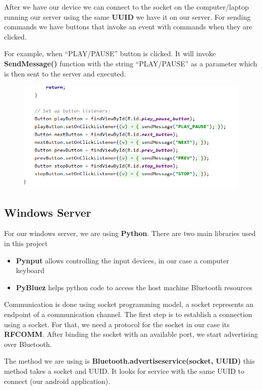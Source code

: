 \documentclass{article}
\begin{document}
After we have our device we can connect to the socket on the computer/laptop running our server
using the same \textbf{UUID} we have it on our server.  For sending commands we have buttons that
invoke an event with commands when they are clicked.

For example, when “PLAY/PAUSE” button is clicked. It will invoke \textbf{SendMessage()} function
with the string “PLAY/PAUSE” as a parameter which is then sent to the server and executed. 

\begin{figure}[ht]
\centering
\includegraphics[scale=.5]{./sendMsg.png}
\end{figure}

\subsection{Windows Server}

For our windows server, we are using \textbf{Python}. There are two main libraries used in this project

\begin{itemize}
\item \textbf{Pynput} allows controlling the input devices, in our case a computer keyboard

\item \textbf{PyBluez} helps python code to access the host machine Bluetooth resources

\end{itemize}


Communication is done using socket programming model, a socket represents an endpoint of a
communication channel. The first step is to establish a connection using a socket. For that, we need
a protocol for the socket in our case its \textbf{RFCOMM}. After binding the socket with an
available port, we start advertising over Bluetooth.
 
The method we are using is \textbf{ Bluetooth.advertise\textunderscore service(socket, UUID)} this
method takes a socket and UUID. It looks for service with the same UUID to connect (our android
application).
\end{document}
